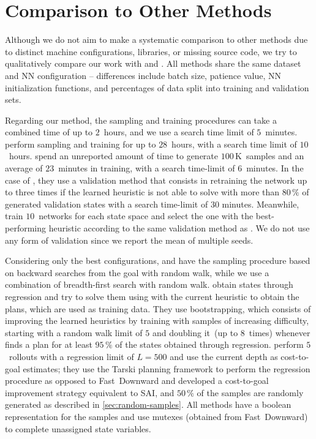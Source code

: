 \section{Comparison to Other Methods}
\label{sec:large-exps-comparison}

Although we do not aim to make a systematic comparison to other methods due to distinct machine configurations, libraries, or missing source code, we try to qualitatively compare our work with \citet{ferber2022neural} and \citet{otoole2022sampling}. All methods share the same dataset and NN configuration -- differences include batch size, patience value, NN initialization functions, and percentages of data split into training and validation sets.

Regarding our method, the sampling and training procedures can take a combined time of up to $2$~hours, and we use a search time limit of $5$~minutes. \citet{ferber2022neural} perform sampling and training for up to $28$~hours, with a search time limit of $10$~hours. \citet{otoole2022sampling} spend an unreported amount of time to generate $100$\,K~samples and an average of $23$~minutes in training, with a search time-limit of $6$~minutes. In the case of \citet{ferber2022neural}, they use a validation method that consists in retraining the network up to three times if the learned heuristic is not able to solve with \gbfs more than $80\,\%$ of generated validation states with a search time-limit of $30$ minutes. Meanwhile, \citet{otoole2022sampling} train $10$~networks for each state space and select the one with the best-performing heuristic according to the same validation method as \citet{ferber2022neural}. We do not use any form of validation since we report the mean of multiple seeds.

Considering only the best configurations, \citet{ferber2022neural} and \citet{otoole2022sampling} have the sampling procedure based on backward searches from the goal with random walk, while we use a combination of breadth-first search with random walk. \citet{ferber2022neural} obtain states through regression and try to solve them using \gbfs with the current heuristic to obtain the plans, which are used as training data. They use bootstrapping, which consists of improving the learned heuristics by training with samples of increasing difficulty, starting with a random walk limit of $5$ and doubling it~(up to $8$~times) whenever \gbfs finds a plan for at least $95\,\%$ of the states obtained through regression. \citet{otoole2022sampling} perform $5$~rollouts with a regression limit of $L=500$ and use the current depth as cost-to-goal estimates; they use the Tarski planning framework to perform the regression procedure as opposed to Fast~Downward and developed a cost-to-goal improvement strategy equivalent to SAI, and $50\,\%$ of the samples are randomly generated as described in \cref{sec:random-samples}. All methods have a boolean representation for the samples and use mutexes (obtained from Fast~Downward) to complete unassigned state variables.

